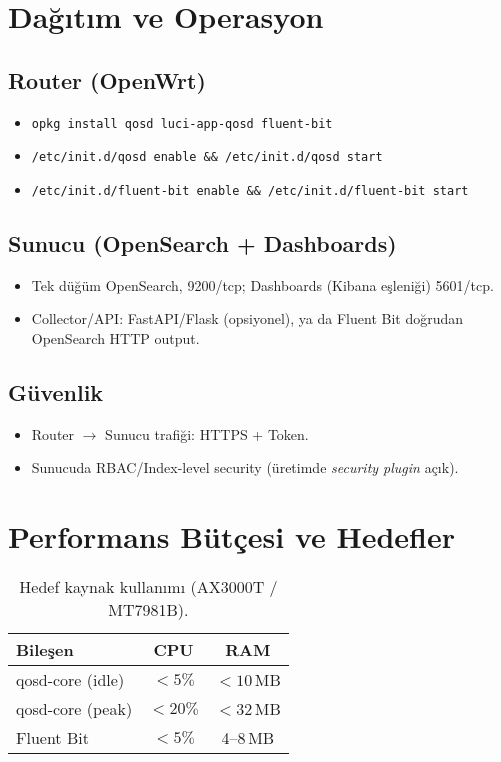 \documentclass[11pt,a4paper]{article}
\begin{document}
\section{Dağıtım ve Operasyon}
\subsection{Router (OpenWrt)}
\begin{itemize}
  \item \texttt{opkg install qosd luci-app-qosd fluent-bit}
  \item \texttt{/etc/init.d/qosd enable \&\& /etc/init.d/qosd start}
  \item \texttt{/etc/init.d/fluent-bit enable \&\& /etc/init.d/fluent-bit start}
\end{itemize}

\subsection{Sunucu (OpenSearch + Dashboards)}
\begin{itemize}
  \item Tek düğüm OpenSearch, 9200/tcp; Dashboards (Kibana eşleniği) 5601/tcp.
  \item Collector/API: FastAPI/Flask (opsiyonel), ya da Fluent Bit doğrudan OpenSearch HTTP output.
\end{itemize}

\subsection{Güvenlik}
\begin{itemize}
  \item Router $\rightarrow$ Sunucu trafiği: HTTPS + Token.
  \item Sunucuda RBAC/Index-level security (üretimde \emph{security plugin} açık).
\end{itemize}

\section{Performans Bütçesi ve Hedefler}
\begin{table}[H]
  \centering
  \begin{tabular}{@{}lcc@{}}
    \toprule
    \textbf{Bileşen} & \textbf{CPU} & \textbf{RAM} \\
    \midrule
    qosd-core (idle) & $<\!5\%$ & $<\!10$\,MB \\
    qosd-core (peak) & $<\!20\%$ & $<\!32$\,MB \\
    Fluent Bit       & $<\!5\%$  & 4–8\,MB \\
    \bottomrule
  \end{tabular}
  \caption{Hedef kaynak kullanımı (AX3000T / MT7981B).}
\end{table}
\end{document}
